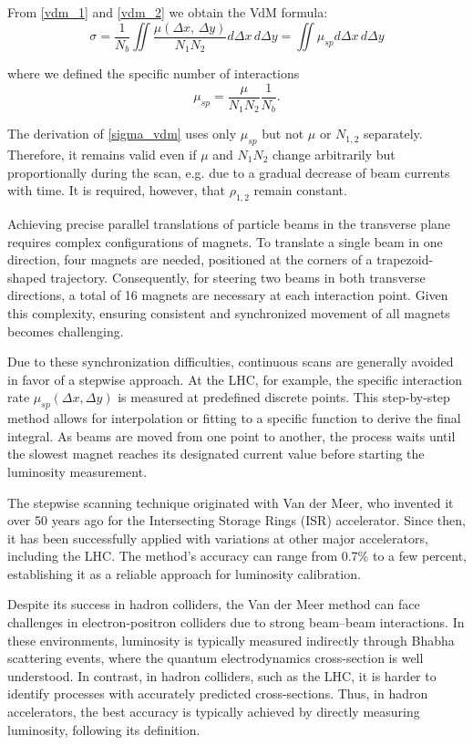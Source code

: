 From \eqref{vdm_1} and \eqref{vdm_2} we obtain the VdM formula:
\begin{equation}
     \sigma = \frac{1}{N_b} \iint \frac{\mu (\Delta x,\, \Delta y)}{N_1N_2} d\Delta x\, d\Delta y= \iint \mu_{sp}d\Delta x\, d \Delta y \label{sigma_vdm}
    \end{equation}

where we defined the specific number of interactions
\begin{equation}
\mu_{sp}=\frac{\mu}{N_1 N_2}\frac{1}{N_b}.\label{mu_sp}
\end{equation}

The derivation of \eqref{sigma_vdm} uses only $\mu _{sp}$ but not $\mu$ or $N_{1,2}$ separately. Therefore, it remains valid even if $\mu$ and $N_1N_2$ change arbitrarily but proportionally during the scan, e.g. due to a gradual decrease of beam currents with time. It is required, however, that $\rho_{1,2}$ remain constant.

Achieving precise parallel translations of particle beams in the transverse plane requires complex configurations of magnets. To translate a single beam in one direction, four magnets are needed, positioned at the corners of a trapezoid-shaped trajectory. Consequently, for steering two beams in both transverse directions, a total of 16 magnets are necessary at each interaction point. Given this complexity, ensuring consistent and synchronized movement of all magnets becomes challenging.

Due to these synchronization difficulties, continuous scans are generally avoided in favor of a stepwise approach. At the LHC, for example, the specific interaction rate $\mu_{sp}(\Delta x,\Delta y)$ is measured at predefined discrete points. This step-by-step method allows for interpolation or fitting to a specific function to derive the final integral. As beams are moved from one point to another, the process waits until the slowest magnet reaches its designated current value before starting the luminosity measurement.

The stepwise scanning technique originated with Van der Meer, who invented it over 50 years ago for the Intersecting Storage Rings (ISR) accelerator\cite{Carboni:156499}. Since then, it has been successfully applied with variations at other major accelerators\cite{Rubbia:1025746}, including the LHC. The method's accuracy can range from 0.7\% to a few percent, establishing it as a reliable approach for luminosity calibration.

Despite its success in hadron colliders, the Van der Meer method can face challenges in electron-positron colliders due to strong beam–beam interactions. In these environments, luminosity is typically measured indirectly through Bhabha scattering events, where the quantum electrodynamics cross-section is well understood. In contrast, in hadron colliders, such as the LHC, it is harder to identify processes with accurately predicted cross-sections. Thus, in hadron accelerators, the best accuracy is typically achieved by directly measuring luminosity, following its definition.

